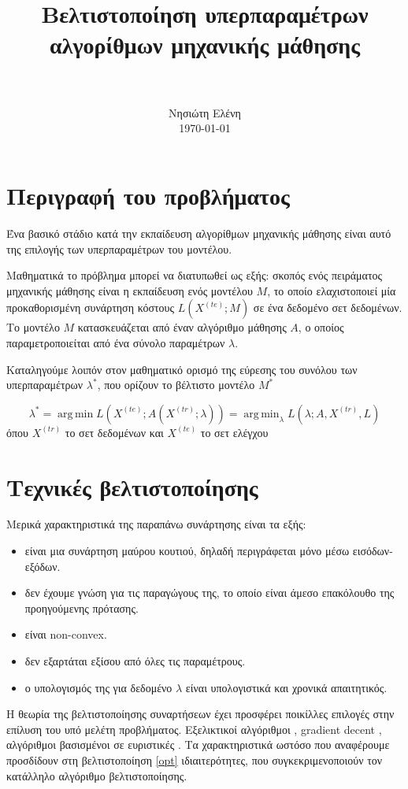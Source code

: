 \documentclass[]{article}
\title{
	\usefont{OT1}{bch}{b}{n}
	\normalfont \normalsize \textsc{} \\ 
	\horrule{0.5pt} \\[0.4cm]
	\huge Βελτιστοποίηση υπερπαραμέτρων \\αλγορίθμων μηχανικής μάθησης \\
	\horrule{2pt} \\[0.5cm]
}
\author{
	\normalfont 								\normalsize
	Νησιώτη Ελένη\\[-3pt]		\normalsize
	\today
}
\date{}
\DeclareMathOperator*{\argmin}{arg\,min}
\numberwithin{equation}{section}		%
\numberwithin{figure}{section}			%
\numberwithin{table}{section}				%
\begin{document}
	\maketitle
	\section{Περιγραφή του προβλήματος }
	Ένα βασικό στάδιο κατά την εκπαίδευση αλγορίθμων μηχανικής μάθησης είναι αυτό της επιλογής των υπερπαραμέτρων του μοντέλου.
	
	Μαθηματικά το πρόβλημα μπορεί να διατυπωθεί ως εξής: σκοπός ενός πειράματος μηχανικής μάθησης είναι η εκπαίδευση ενός μοντέλου $M$, το οποίο ελαχιστοποιεί μία προκαθορισμένη συνάρτηση κόστους $L(X^{(te)};M)$ σε ένα δεδομένο σετ δεδομένων. Το μοντέλο $Μ$ κατασκευάζεται από έναν αλγόριθμο μάθησης $Α$, ο οποίος παραμετροποιείται από ένα σύνολο παραμέτρων $\lambda$.
	
	Καταληγούμε λοιπόν στον μαθηματικό ορισμό της εύρεσης του συνόλου των υπερπαραμέτρων $\lambda^*$, που ορίζουν το βέλτιστο μοντέλο $M^*$
	
	
	\begin{equation}
	\label{opt}
		\lambda^* = \argmin{L(X^{(te)}; A(X^{(tr)}; \lambda))} = \argmin_{\lambda}{L(\lambda; A, X^{(tr)}, L)}
	\end{equation} 
	όπου $X^{(tr)}$ το σετ δεδομένων και $X^{(te)}$ το σετ ελέγχου
	\section{Τεχνικές βελτιστοποίησης}
	Μερικά χαρακτηριστικά της παραπάνω συνάρτησης είναι τα εξής:
	\begin{itemize}
		\item είναι μια συνάρτηση μαύρου κουτιού, δηλαδή περιγράφεται μόνο μέσω εισόδων-εξόδων.
		\item δεν έχουμε γνώση για τις παραγώγους της, το οποίο είναι άμεσο επακόλουθο της προηγούμενης πρότασης.
		\item είναι non-convex. 
		\item δεν εξαρτάται εξίσου από όλες τις παραμέτρους. 
		\item ο υπολογισμός της για δεδομένο $\lambda$ είναι υπολογιστικά και χρονικά απαιτητικός.
	\end{itemize}
	
	Η θεωρία της βελτιστοποίησης συναρτήσεων έχει προσφέρει ποικίλλες επιλογές στην επίλυση του υπό μελέτη προβλήματος. Eξελικτικοί αλγόριθμοι \citep{1554741}, gradient decent \citep{wassenberg},  αλγόριθμοι \citep{Huang2006} βασισμένοι σε ευριστικές \citep{Nelder01011965}. Τα χαρακτηριστικά ωστόσο που αναφέρουμε προσδίδουν στη βελτιστοποίηση \ref{opt} ιδιαιτερότητες, που συγκεκριμενοποιούν τον κατάλληλο αλγόριθμο βελτιστοποίησης. 
\end{document}
